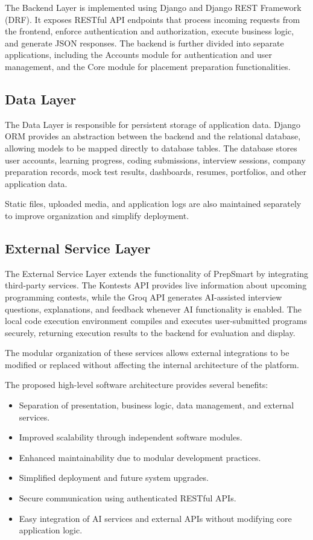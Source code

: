 The Backend Layer is implemented using Django and Django REST Framework (DRF). It exposes RESTful API endpoints that process incoming requests from the frontend, enforce authentication and authorization, execute business logic, and generate JSON responses. The backend is further divided into separate applications, including the Accounts module for authentication and user management, and the Core module for placement preparation functionalities.

\subsection{Data Layer}

The Data Layer is responsible for persistent storage of application data. Django ORM provides an abstraction between the backend and the relational database, allowing models to be mapped directly to database tables. The database stores user accounts, learning progress, coding submissions, interview sessions, company preparation records, mock test results, dashboards, resumes, portfolios, and other application data.

Static files, uploaded media, and application logs are also maintained separately to improve organization and simplify deployment.

\subsection{External Service Layer}

The External Service Layer extends the functionality of PrepSmart by integrating third-party services. The Kontests API provides live information about upcoming programming contests, while the Groq API generates AI-assisted interview questions, explanations, and feedback whenever AI functionality is enabled. The local code execution environment compiles and executes user-submitted programs securely, returning execution results to the backend for evaluation and display.

The modular organization of these services allows external integrations to be modified or replaced without affecting the internal architecture of the platform.

The proposed high-level software architecture provides several benefits:

\begin{itemize}
\item Separation of presentation, business logic, data management, and external services.
\item Improved scalability through independent software modules.
\item Enhanced maintainability due to modular development practices.
\item Simplified deployment and future system upgrades.
\item Secure communication using authenticated RESTful APIs.
\item Easy integration of AI services and external APIs without modifying core application logic.
\end{itemize}

